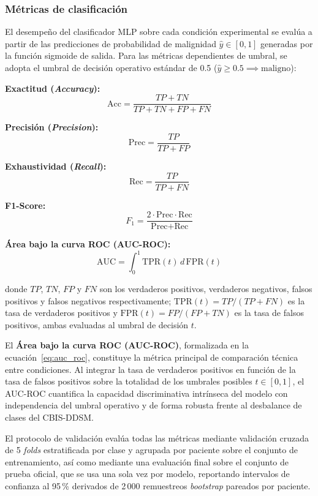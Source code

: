 
\subsubsection{Métricas de clasificación}

El desempeño del clasificador MLP sobre cada condición experimental se evalúa a partir de
las predicciones de probabilidad de malignidad $\hat{y} \in [0, 1]$ generadas por la función
sigmoide de salida. Para las métricas dependientes de umbral, se adopta el umbral de decisión
operativo estándar de 0.5 ($\hat{y} \geq 0.5 \implies \text{maligno}$):

\textbf{Exactitud (\textit{Accuracy}):}
\begin{equation}
  \text{Acc} =
  \frac{TP + TN}{TP + TN + FP + FN}
  \label{eq:accuracy}
\end{equation}

\textbf{Precisión (\textit{Precision}):}
\begin{equation}
  \text{Prec} =
  \frac{TP}{TP + FP}
  \label{eq:precision}
\end{equation}

\textbf{Exhaustividad (\textit{Recall}):}
\begin{equation}
  \text{Rec} =
  \frac{TP}{TP + FN}
  \label{eq:recall}
\end{equation}

\textbf{F1-Score:}
\begin{equation}
  F_1 =
  \frac{2 \cdot \text{Prec} \cdot \text{Rec}}
  {\text{Prec} + \text{Rec}}
  \label{eq:f1}
\end{equation}

\textbf{Área bajo la curva ROC (AUC-ROC):}
\begin{equation}
  \text{AUC} =
  \int_0^1 \text{TPR}(t)\,d\,\text{FPR}(t)
  \label{eq:auc_roc}
\end{equation}

\noindent donde $TP$, $TN$, $FP$ y $FN$ son los
verdaderos positivos, verdaderos negativos, falsos
positivos y falsos negativos respectivamente;
$\text{TPR}(t) = TP/(TP+FN)$ es la tasa de verdaderos
positivos y $\text{FPR}(t) = FP/(FP+TN)$ es la tasa
de falsos positivos, ambas evaluadas al umbral de
decisión $t$.

El \textbf{Área bajo la curva ROC (AUC-ROC)}, formalizada en la ecuación~\eqref{eq:auc_roc},
constituye la métrica principal de comparación técnica entre condiciones. Al integrar la
tasa de verdaderos positivos en función de la tasa de falsos positivos sobre la totalidad de
los umbrales posibles $t \in [0, 1]$, el AUC-ROC cuantifica la capacidad discriminativa intrínseca
del modelo con independencia del umbral operativo y de forma robusta frente al desbalance
de clases del CBIS-DDSM.

El protocolo de validación evalúa todas las métricas mediante validación cruzada de 5 \textit{folds}
estratificada por clase y agrupada por paciente sobre el conjunto de entrenamiento, así
como mediante una evaluación final sobre el conjunto de prueba oficial, que se usa una sola vez por modelo, reportando
intervalos de confianza al 95\,\% derivados de 2\,000 remuestreos \textit{bootstrap} pareados por
paciente.
